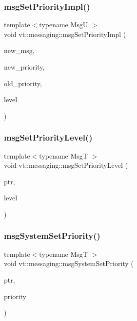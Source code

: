 \subsubsection{\texorpdfstring{msg\+Set\+Priority\+Impl()}{msgSetPriorityImpl()}}
{\footnotesize\ttfamily template$<$typename MsgU $>$ \\
void vt\+::messaging\+::msg\+Set\+Priority\+Impl (\begin{DoxyParamCaption}\item[{MsgU}]{new\+\_\+msg,  }\item[{\hyperlink{namespacevt_a86bff9f556eb761b27fc8600d006ac04}{Priority\+Type}}]{new\+\_\+priority,  }\item[{\hyperlink{namespacevt_a86bff9f556eb761b27fc8600d006ac04}{Priority\+Type}}]{old\+\_\+priority,  }\item[{\hyperlink{namespacevt_a53e07fdb3351b0f263e0dfd51b968d5e}{Priority\+Level\+Type}}]{level }\end{DoxyParamCaption})}

\mbox{\label{namespacevt_1_1messaging_a5cca7f3fb7db0bfe14b3426ef9132090}} 
\subsubsection{\texorpdfstring{msg\+Set\+Priority\+Level()}{msgSetPriorityLevel()}}
{\footnotesize\ttfamily template$<$typename MsgT $>$ \\
void vt\+::messaging\+::msg\+Set\+Priority\+Level (\begin{DoxyParamCaption}\item[{MsgT}]{ptr,  }\item[{\hyperlink{namespacevt_a53e07fdb3351b0f263e0dfd51b968d5e}{Priority\+Level\+Type}}]{level }\end{DoxyParamCaption})}

\mbox{\label{namespacevt_1_1messaging_ab609ea1ed68952c30bc8f9bba8d796b2}} 
\subsubsection{\texorpdfstring{msg\+System\+Set\+Priority()}{msgSystemSetPriority()}}
{\footnotesize\ttfamily template$<$typename MsgT $>$ \\
void vt\+::messaging\+::msg\+System\+Set\+Priority (\begin{DoxyParamCaption}\item[{MsgT}]{ptr,  }\item[{\hyperlink{namespacevt_a86bff9f556eb761b27fc8600d006ac04}{Priority\+Type}}]{priority }\end{DoxyParamCaption})}



